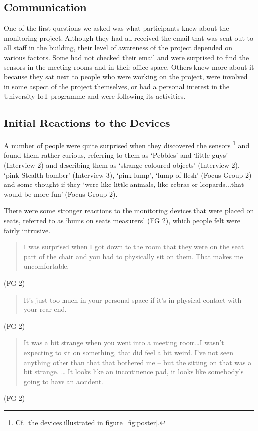 \subsection{Communication}
\label{sec:communication}

One of the first questions we asked was what participants knew about
the monitoring project. Although they had all received the email that
was sent out to all staff in the building, their level of awareness of
the project depended on various factors. Some had not checked their
email and were surprised to find the sensors in the meeting rooms and
in their office space. Others knew more about it because they sat next
to people who were working on the project, were involved in some
aspect of the project themselves, or had a personal interest in the
University IoT programme and were following its activities.

\subsection{Initial Reactions to the Devices}
\label{sec:init-reactions}

A number of people were quite surprised when they discovered the
sensors%
\footnote{ 
Cf.\ the devices illustrated in figure~\ref{fig:poster}.
}
and found them rather curious, referring to them as `Pebbles’
and ‘little guys’ (Interview 2) and describing them as
`strange-coloured objects’ (Interview 2), `pink Stealth bomber’
(Interview 3), `pink lump’, `lump of flesh’ (Focus Group 2) and some
thought if they `were like little animals, like zebras or
leopards...that would be more fun’ (Focus Group 2).

There were some stronger reactions to the monitoring devices that were
placed on seats, referred to as `bums on seats measurers’ (FG 2),
which people felt were fairly intrusive.

\begin{quote}I was surprised when I got down to the room that they were on the
seat part of the chair and you had to physically sit on them. That
makes me uncomfortable.\end{quote} (FG 2)

\begin{quote}It’s just too much in your personal space if it’s in
  physical contact with your rear end.\end{quote} (FG 2)

\begin{quote}It was a bit strange when you went into a meeting room…I wasn’t
expecting to sit on something, that did feel a bit weird. I’ve not
seen anything other than that that bothered me – but the sitting on
that was a bit strange. … It looks like an incontinence pad, it looks
like somebody’s going to have an accident.\end{quote} (FG 2)

